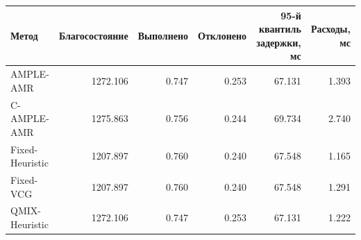 \begin{tabular}{lrrrrr}
\toprule
 Метод & Благосостояние & Выполнено & Отклонено & 95-й квантиль задержки, мс & Расходы, мс \\
\midrule
 AMPLE-AMR & 1272.106 & 0.747 & 0.253 & 67.131 & 1.393 \\
 C-AMPLE-AMR & 1275.863 & 0.756 & 0.244 & 69.734 & 2.740 \\
 Fixed-Heuristic & 1207.897 & 0.760 & 0.240 & 67.548 & 1.165 \\
 Fixed-VCG & 1207.897 & 0.760 & 0.240 & 67.548 & 1.291 \\
 QMIX-Heuristic & 1272.106 & 0.747 & 0.253 & 67.131 & 1.222 \\
\bottomrule
\end{tabular}
